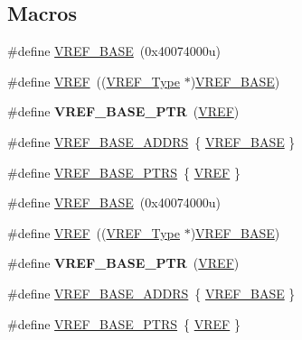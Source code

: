 \subsection*{Macros}
\begin{DoxyCompactItemize}
\item 
\#define \hyperlink{group__VREF__Peripheral__Access__Layer_ga4a13ce72546505561e4a780677ec0375}{V\+R\+E\+F\+\_\+\+B\+A\+SE}~(0x40074000u)
\item 
\#define \hyperlink{group__VREF__Peripheral__Access__Layer_ga2c9e85d22a9ba37ea589b1747af46307}{V\+R\+EF}~((\hyperlink{structVREF__Type}{V\+R\+E\+F\+\_\+\+Type} $\ast$)\hyperlink{group__VREF__Peripheral__Access__Layer_ga4a13ce72546505561e4a780677ec0375}{V\+R\+E\+F\+\_\+\+B\+A\+SE})
\item 
\#define {\bfseries V\+R\+E\+F\+\_\+\+B\+A\+S\+E\+\_\+\+P\+TR}~(\hyperlink{group__VREF__Peripheral__Access__Layer_ga2c9e85d22a9ba37ea589b1747af46307}{V\+R\+EF})\hypertarget{group__VREF__Peripheral__Access__Layer_ga53dba79dbefcdd6f788740a6d0caa57d}{}\label{group__VREF__Peripheral__Access__Layer_ga53dba79dbefcdd6f788740a6d0caa57d}

\item 
\#define \hyperlink{group__VREF__Peripheral__Access__Layer_gac0ccacace16937d7109589180bb2650b}{V\+R\+E\+F\+\_\+\+B\+A\+S\+E\+\_\+\+A\+D\+D\+RS}~\{ \hyperlink{group__VREF__Peripheral__Access__Layer_ga4a13ce72546505561e4a780677ec0375}{V\+R\+E\+F\+\_\+\+B\+A\+SE} \}
\item 
\#define \hyperlink{group__VREF__Peripheral__Access__Layer_ga3eb17aee5de4a519ee18fe763e43865b}{V\+R\+E\+F\+\_\+\+B\+A\+S\+E\+\_\+\+P\+T\+RS}~\{ \hyperlink{group__VREF__Peripheral__Access__Layer_ga2c9e85d22a9ba37ea589b1747af46307}{V\+R\+EF} \}
\item 
\#define \hyperlink{group__VREF__Peripheral__Access__Layer_ga4a13ce72546505561e4a780677ec0375}{V\+R\+E\+F\+\_\+\+B\+A\+SE}~(0x40074000u)
\item 
\#define \hyperlink{group__VREF__Peripheral__Access__Layer_ga2c9e85d22a9ba37ea589b1747af46307}{V\+R\+EF}~((\hyperlink{structVREF__Type}{V\+R\+E\+F\+\_\+\+Type} $\ast$)\hyperlink{group__VREF__Peripheral__Access__Layer_ga4a13ce72546505561e4a780677ec0375}{V\+R\+E\+F\+\_\+\+B\+A\+SE})
\item 
\#define {\bfseries V\+R\+E\+F\+\_\+\+B\+A\+S\+E\+\_\+\+P\+TR}~(\hyperlink{group__VREF__Peripheral__Access__Layer_ga2c9e85d22a9ba37ea589b1747af46307}{V\+R\+EF})\hypertarget{group__VREF__Peripheral__Access__Layer_ga53dba79dbefcdd6f788740a6d0caa57d}{}\label{group__VREF__Peripheral__Access__Layer_ga53dba79dbefcdd6f788740a6d0caa57d}

\item 
\#define \hyperlink{group__VREF__Peripheral__Access__Layer_gac0ccacace16937d7109589180bb2650b}{V\+R\+E\+F\+\_\+\+B\+A\+S\+E\+\_\+\+A\+D\+D\+RS}~\{ \hyperlink{group__VREF__Peripheral__Access__Layer_ga4a13ce72546505561e4a780677ec0375}{V\+R\+E\+F\+\_\+\+B\+A\+SE} \}
\item 
\#define \hyperlink{group__VREF__Peripheral__Access__Layer_ga3eb17aee5de4a519ee18fe763e43865b}{V\+R\+E\+F\+\_\+\+B\+A\+S\+E\+\_\+\+P\+T\+RS}~\{ \hyperlink{group__VREF__Peripheral__Access__Layer_ga2c9e85d22a9ba37ea589b1747af46307}{V\+R\+EF} \}
\end{DoxyCompactItemize}

